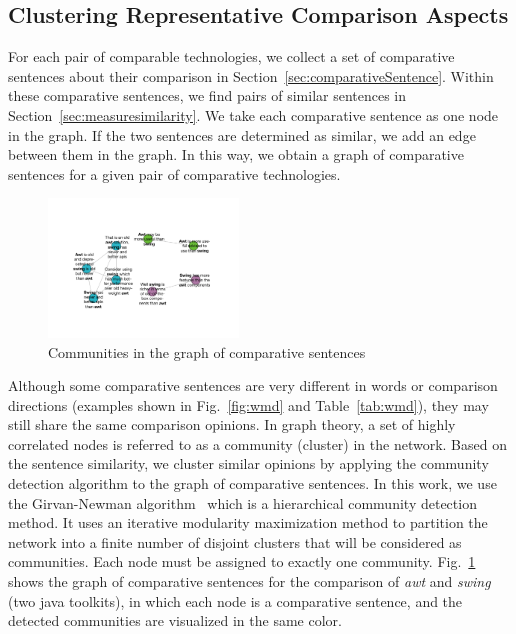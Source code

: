 \subsection{Clustering Representative Comparison Aspects}
For each pair of comparable technologies, we collect a set of comparative sentences about their comparison in Section~\ref{sec:comparativeSentence}.
Within these comparative sentences, we find pairs of similar sentences in Section~\ref{sec:measuresimilarity}.
We take each comparative sentence as one node in the graph.
If the two sentences are determined as similar, we add an edge between them in the graph.
In this way, we obtain a graph of comparative sentences for a given pair of comparative technologies.

\begin{figure}
	\centering
	\includegraphics[width=0.45\textwidth]{figures/communities.pdf}
	\vspace{-6mm}
	\caption{Communities in the graph of comparative sentences }
	\vspace{-3mm}
	\label{fig:communities}
\end{figure} 

Although some comparative sentences are very different in words or comparison directions (examples shown in Fig.~\ref{fig:wmd} and Table~\ref{tab:wmd}), they may still share the same comparison opinions.
In graph theory, a set of highly correlated nodes is referred to as a community (cluster) in the network.
Based on the sentence similarity, we cluster similar opinions by applying the community detection algorithm to the graph of comparative sentences.
In this work, we use the Girvan-Newman algorithm~\cite{girvan2002community} which is a hierarchical community detection method.
It uses an iterative modularity maximization method to partition the network into a finite number of disjoint clusters that will be considered as communities. 
Each node must be assigned to exactly one community.
Fig.~\ref{fig:communities} shows the graph of comparative sentences for the comparison of \textit{awt} and \textit{swing} (two java toolkits), in which each node is a comparative sentence, and the detected communities are visualized in the same color.

